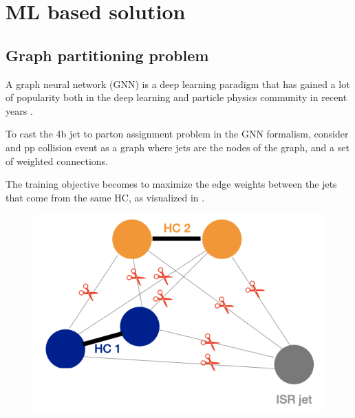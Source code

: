 \section{ML based solution}

\subsection{Graph partitioning problem}

A graph neural network (GNN) is a deep learning paradigm that has gained a lot of popularity both in the deep learning and particle physics community in recent years \cite{I should find a few references for this}.


To cast the 4b jet to parton assignment problem in the GNN formalism, consider and pp collision event as a graph where jets are the nodes of the graph, and a set of weighted connections.

The training objective becomes to maximize the edge weights between the jets that come from the same HC, as visualized in \Fig{\ref{fig:pag-partition}}.

\begin{figure}[hbt]
\centering
\includegraphics{figures/pairAGraph/pag-graph-partitioning}
\caption{}
\label{fig:pag-partition}
\end{figure}

